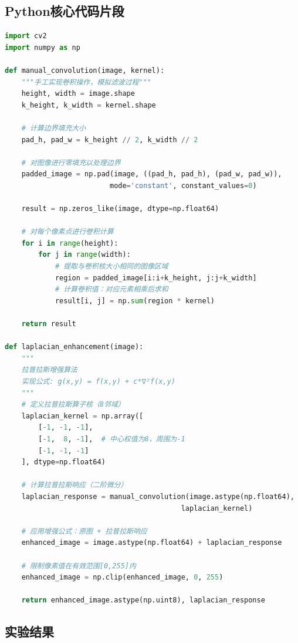 \documentclass[a4paper]{article}
\begin{document}
\subsection{Python核心代码片段}
\begin{lstlisting}[language=Python, caption={拉普拉斯增强主要流程}]
import cv2
import numpy as np

def manual_convolution(image, kernel):
    """手工实现卷积操作，模拟滤波过程"""
    height, width = image.shape
    k_height, k_width = kernel.shape
    
    # 计算边界填充大小
    pad_h, pad_w = k_height // 2, k_width // 2
    
    # 对图像进行零填充以处理边界
    padded_image = np.pad(image, ((pad_h, pad_h), (pad_w, pad_w)), 
                         mode='constant', constant_values=0)
    
    result = np.zeros_like(image, dtype=np.float64)
    
    # 对每个像素点进行卷积计算
    for i in range(height):
        for j in range(width):
            # 提取与卷积核大小相同的图像区域
            region = padded_image[i:i+k_height, j:j+k_width]
            # 计算卷积值：对应元素相乘后求和
            result[i, j] = np.sum(region * kernel)
    
    return result

def laplacian_enhancement(image):
    """
    拉普拉斯增强算法
    实现公式: g(x,y) = f(x,y) + c*∇²f(x,y)
    """
    # 定义拉普拉斯算子核（8邻域）
    laplacian_kernel = np.array([
        [-1, -1, -1],
        [-1,  8, -1],  # 中心权值为8，周围为-1
        [-1, -1, -1]
    ], dtype=np.float64)
    
    # 计算拉普拉斯响应（二阶微分）
    laplacian_response = manual_convolution(image.astype(np.float64), 
                                          laplacian_kernel)
    
    # 应用增强公式：原图 + 拉普拉斯响应
    enhanced_image = image.astype(np.float64) + laplacian_response
    
    # 限制像素值在有效范围[0,255]内
    enhanced_image = np.clip(enhanced_image, 0, 255)
    
    return enhanced_image.astype(np.uint8), laplacian_response
\end{lstlisting}

\subsection{实验结果}
\end{document}
